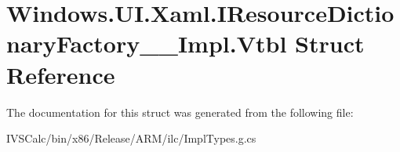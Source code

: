 \hypertarget{struct_windows_1_1_u_i_1_1_xaml_1_1_i_resource_dictionary_factory_____impl_1_1_vtbl}{}\section{Windows.\+U\+I.\+Xaml.\+I\+Resource\+Dictionary\+Factory\+\_\+\+\_\+\+Impl.\+Vtbl Struct Reference}
\label{struct_windows_1_1_u_i_1_1_xaml_1_1_i_resource_dictionary_factory_____impl_1_1_vtbl}


The documentation for this struct was generated from the following file\+:\begin{DoxyCompactItemize}
\item 
I\+V\+S\+Calc/bin/x86/\+Release/\+A\+R\+M/ilc/Impl\+Types.\+g.\+cs\end{DoxyCompactItemize}
